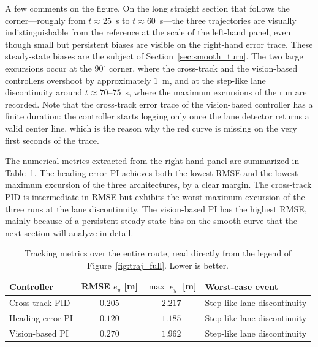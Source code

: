 A few comments on the figure. On the long straight section that follows the corner---roughly from $t \approx 25$~s to $t \approx 60$~s---the three trajectories are visually indistinguishable from the reference at the scale of the left-hand panel, even though small but persistent biases are visible on the right-hand error trace. These steady-state biases are the subject of Section~\ref{sec:smooth_turn}. The two large excursions occur at the $90^\circ$ corner, where the cross-track and the vision-based controllers overshoot by approximately $1$~m, and at the step-like lane discontinuity around $t \approx 70$--$75$~s, where the maximum excursions of the run are recorded. Note that the cross-track error trace of the vision-based controller has a finite duration: the controller starts logging only once the lane detector returns a valid center line, which is the reason why the red curve is missing on the very first seconds of the trace.

The numerical metrics extracted from the right-hand panel are summarized in Table~\ref{tab:full_metrics}. The heading-error PI achieves both the lowest \ac{RMSE} and the lowest maximum excursion of the three architectures, by a clear margin. The cross-track PID is intermediate in \ac{RMSE} but exhibits the worst maximum excursion of the three runs at the lane discontinuity. The vision-based PI has the highest \ac{RMSE}, mainly because of a persistent steady-state bias on the smooth curve that the next section will analyze in detail.

\begin{table}[htbp]
    \centering
    \footnotesize
    \begin{tabular}{@{} l c c l @{}}
        \toprule
        \textbf{Controller} & \textbf{\acs{RMSE} $e_y$ [m]} & \textbf{$\max \lvert e_y \rvert$ [m]} & \textbf{Worst-case event} \\
        \midrule
        Cross-track PID  & $0.205$ & $2.217$ & Step-like lane discontinuity \\
        \addlinespace
        Heading-error PI & $0.120$ & $1.185$ & Step-like lane discontinuity \\
        \addlinespace
        Vision-based PI  & $0.270$ & $1.962$ & Step-like lane discontinuity \\
        \bottomrule
    \end{tabular}
    \caption{Tracking metrics over the entire route, read directly from the legend of Figure~\ref{fig:traj_full}. Lower is better.}
    \label{tab:full_metrics}
\end{table}

